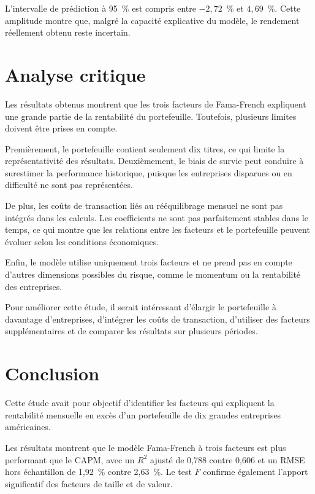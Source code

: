 \documentclass[12pt,a4paper]{article}
\begin{document}
L'intervalle de prédiction à 95~\% est compris entre $-2{,}72$~\% et $4{,}69$~\%. Cette amplitude montre que, malgré la capacité explicative du modèle, le rendement réellement obtenu reste incertain.

\section{Analyse critique}

Les résultats obtenus montrent que les trois facteurs de Fama-French expliquent une grande partie de la rentabilité du portefeuille. Toutefois, plusieurs limites doivent être prises en compte.

Premièrement, le portefeuille contient seulement dix titres, ce qui limite la représentativité des résultats. Deuxièmement, le biais de survie peut conduire à surestimer la performance historique, puisque les entreprises disparues ou en difficulté ne sont pas représentées.

De plus, les coûts de transaction liés au rééquilibrage mensuel ne sont pas intégrés dans les calculs. Les coefficients ne sont pas parfaitement stables dans le temps, ce qui montre que les relations entre les facteurs et le portefeuille peuvent évoluer selon les conditions économiques.

Enfin, le modèle utilise uniquement trois facteurs et ne prend pas en compte d'autres dimensions possibles du risque, comme le momentum ou la rentabilité des entreprises.

Pour améliorer cette étude, il serait intéressant d'élargir le portefeuille à davantage d'entreprises, d'intégrer les coûts de transaction, d'utiliser des facteurs supplémentaires et de comparer les résultats sur plusieurs périodes.

\section{Conclusion}

Cette étude avait pour objectif d'identifier les facteurs qui expliquent la rentabilité mensuelle en excès d'un portefeuille de dix grandes entreprises américaines.

Les résultats montrent que le modèle Fama-French à trois facteurs est plus performant que le CAPM, avec un $R^2$ ajusté de 0,788 contre 0,606 et un RMSE hors échantillon de 1,92~\% contre 2,63~\%. Le test $F$ confirme également l'apport significatif des facteurs de taille et de valeur.
\end{document}
